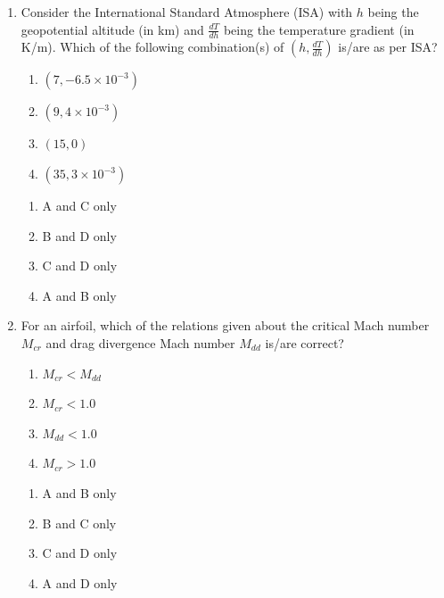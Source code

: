 \documentclass{article}
\begin{document}
\begin{enumerate}[leftmargin=*, resume]
\item Consider the International Standard Atmosphere (ISA) with $h$ being the geopotential altitude (in km) and $\frac{dT}{dh}$ being the temperature gradient (in K/m). Which of the following combination(s) of $\left(h, \frac{dT}{dh}\right)$ is/are as per ISA?
\begin{enumerate}
\item $(7, -6.5 \times 10^{-3})$
\item $(9, 4 \times 10^{-3})$
\item $(15, 0)$
\item $(35, 3 \times 10^{-3})$
\end{enumerate}
\begin{multicols}{4}
\begin{enumerate}
\item A and C only
\item B and D only
\item C and D only
\item A and B only
\end{enumerate}
\end{multicols}

\item For an airfoil, which of the relations given about the critical Mach number $M_{cr}$ and drag divergence Mach number $M_{dd}$ is/are correct?
\begin{enumerate}
\item $M_{cr} < M_{dd}$
\item $M_{cr} < 1.0$
\item $M_{dd} < 1.0$
\item $M_{cr} > 1.0$
\end{enumerate}
\begin{multicols}{4}
\begin{enumerate}
\item A and B only
\item B and C only
\item C and D only
\item A and D only
\end{enumerate}
\end{multicols}


\end{enumerate}
\end{document}
